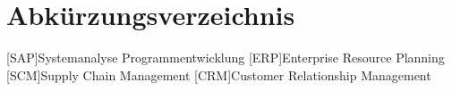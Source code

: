 \clearpage
\chapter*{Abkürzungsverzeichnis}	

\begin{acronym}[XXXXXXX]
	[SAP]{Systemanalyse Programmentwicklung}
	[ERP]{Enterprise Resource Planning}
	[SCM]{Supply Chain Management}
	[CRM]{Customer Relationship Management}
\end{acronym}